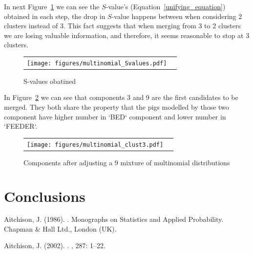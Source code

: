 \documentclass[10pt, a4paper]{article}
\begin{document}
\begin{spacing}{1.9}
In next Figure~\ref{multinomial_Svalues} we can see the $S$-value's (Equation~\ref{unifying_equation}) obtained in each step, the drop in $S$-value happens between when considering 2 clusters instead of 3. This fact suggests that when merging from 3 to 2 clusters we are losing valuable information, and therefore, it seems reasonable to stop at 3 clusters.

\begin{figure}[t]
\begin{center}
\begin{tabular}{cc}
  \texttt{[image: figures/multinomial\_Svalues.pdf]} \\
 \end{tabular}
 \caption{S-values obatined}\label{multinomial_Svalues}
\end{center}
\end{figure}

In Figure~\ref{multinomial_clust3} we can see that components 3 and 9 are the first candidates to be merged. They both share the property that the pigs modelled by those two component have higher number in `BED` component and lower number in `FEEDER`.

\begin{figure}[t]
\begin{center}
\begin{tabular}{cc}
  \texttt{[image: figures/multinomial\_clust3.pdf]} \\
 \end{tabular}
 \caption{Components after adjusting a 9 mixture of multinomial distributions}\label{multinomial_clust3}
\end{center}
\end{figure}

\section{Conclusions}

\newpage


\begin{thebibliography}{}

Aitchison, J. (1986).
.
\newblock Monographs on Statistics and Applied Probability. Chapman \& Hall
  Ltd., London (UK).

Aitchison, J. (2002).
.
, 287: 1--22.


\end{thebibliography}
\end{spacing}
\end{document}
